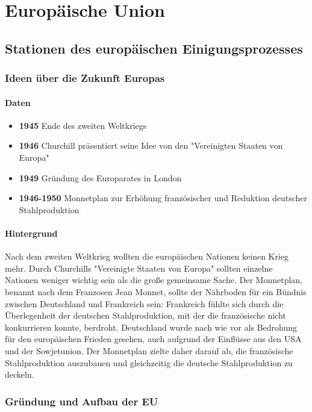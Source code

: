 \documentclass{article}
\begin{document}
	\section{Europäische Union}

	\subsection{Stationen des europäischen Einigungsprozesses}
	\subsubsection{Ideen über die Zukunft Europas}
	\paragraph{Daten}
	\begin{itemize}
		\item \textbf{1945} Ende des zweiten Weltkriegs
		\item \textbf{1946} Churchill präsentiert seine Idee von den "Vereinigten Staaten von Europa"
		\item \textbf{1949} Gründung des Europarates in London
		\item \textbf{1946-1950} Monnetplan zur Erhöhung französischer und Reduktion deutscher Stahlproduktion
	\end{itemize}

	\paragraph{Hintergrund}
	Nach dem zweiten Weltkrieg wollten die europäischen Nationen keinen Krieg mehr. Durch Churchills "Vereinigte Staaten von Europa" sollten einzelne Nationen weniger wichtig sein als die große gemeinsame Sache. Der Monnetplan, benannt nach dem Franzosen Jean Monnet, sollte der Nährboden für ein Bündnis zwischen Deutschland und Frankreich sein: Frankreich fühlte sich durch die Überlegenheit der deutschen Stahlproduktion, mit der die französische nicht konkurrieren konnte, berdroht. Deutschland wurde nach wie vor als Bedrohung für den europäischen Frieden gesehen, auch aufgrund der Einflüsse aus den USA und der Sowjetunion. Der Monnetplan zielte daher darauf ab, die französische Stahlproduktion auszubauen und gleichzeitig die deutsche Stahlproduktion zu deckeln. 

	\subsubsection{Gründung und Aufbau der EU}
\end{document}
